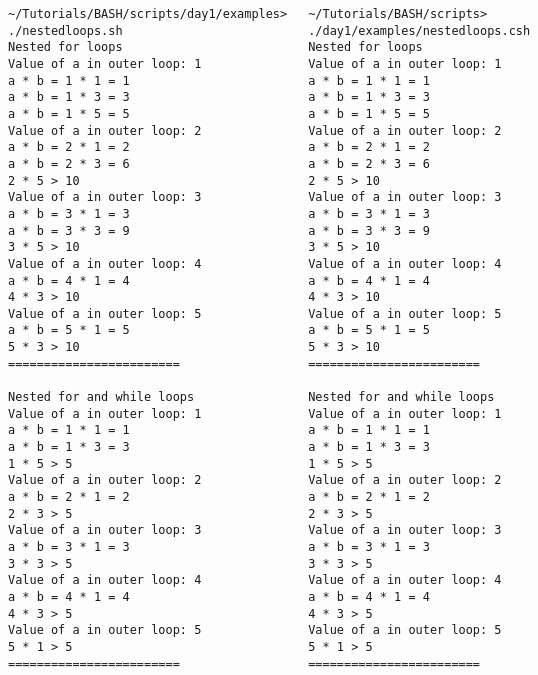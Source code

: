 \documentclass[slidestop,mathserif,compress,xcolor=svgnames]{beamer}
\newenvironment{bblock}[0]
{
\begin{beamerboxesrounded}[upper=uppercol1,lower=lowercol1,shadow=true]}
{\end{beamerboxesrounded}}
\newenvironment{eblock}[0]
{
\begin{beamerboxesrounded}[upper=uppercol2,lower=lowercol2,shadow=true]}
{\end{beamerboxesrounded}}
\begin{document}
\begin{frame}
{\begin{columns}
    \end{columns}
    \framebreak
    \begin{columns}
      \vspace{-0.2cm}
      \begin{eblock}{}
        \begin{lstlisting}[basicstyle=\fontsize{4}{5}\selectfont\ttfamily]
~/Tutorials/BASH/scripts/day1/examples> ./nestedloops.sh 
Nested for loops
Value of a in outer loop: 1
a * b = 1 * 1 = 1
a * b = 1 * 3 = 3
a * b = 1 * 5 = 5
Value of a in outer loop: 2
a * b = 2 * 1 = 2
a * b = 2 * 3 = 6
2 * 5 > 10
Value of a in outer loop: 3
a * b = 3 * 1 = 3
a * b = 3 * 3 = 9
3 * 5 > 10
Value of a in outer loop: 4
a * b = 4 * 1 = 4
4 * 3 > 10
Value of a in outer loop: 5
a * b = 5 * 1 = 5
5 * 3 > 10
========================

Nested for and while loops
Value of a in outer loop: 1
a * b = 1 * 1 = 1
a * b = 1 * 3 = 3
1 * 5 > 5
Value of a in outer loop: 2
a * b = 2 * 1 = 2
2 * 3 > 5
Value of a in outer loop: 3
a * b = 3 * 1 = 3
3 * 3 > 5
Value of a in outer loop: 4
a * b = 4 * 1 = 4
4 * 3 > 5
Value of a in outer loop: 5
5 * 1 > 5
========================
        \end{lstlisting}
      \end{eblock}
      \vspace{-0.2cm}
      \begin{bblock}{}
        \begin{lstlisting}[basicstyle=\fontsize{4}{5}\selectfont\ttfamily]
~/Tutorials/BASH/scripts> ./day1/examples/nestedloops.csh 
Nested for loops
Value of a in outer loop: 1
a * b = 1 * 1 = 1
a * b = 1 * 3 = 3
a * b = 1 * 5 = 5
Value of a in outer loop: 2
a * b = 2 * 1 = 2
a * b = 2 * 3 = 6
2 * 5 > 10
Value of a in outer loop: 3
a * b = 3 * 1 = 3
a * b = 3 * 3 = 9
3 * 5 > 10
Value of a in outer loop: 4
a * b = 4 * 1 = 4
4 * 3 > 10
Value of a in outer loop: 5
a * b = 5 * 1 = 5
5 * 3 > 10
========================

Nested for and while loops
Value of a in outer loop: 1
a * b = 1 * 1 = 1
a * b = 1 * 3 = 3
1 * 5 > 5
Value of a in outer loop: 2
a * b = 2 * 1 = 2
2 * 3 > 5
Value of a in outer loop: 3
a * b = 3 * 1 = 3
3 * 3 > 5
Value of a in outer loop: 4
a * b = 4 * 1 = 4
4 * 3 > 5
Value of a in outer loop: 5
5 * 1 > 5
========================
        \end{lstlisting}
      \end{bblock}
    \end{columns}
  }
\end{frame}
\end{document}
